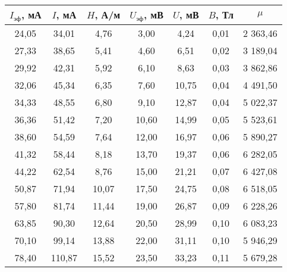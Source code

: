 \begin{table}[h!]
    \begin{center}
        \begin{tabular}{|c|c|c|c|c|c|c|}
            \hline
            $I_{\text{эф}}$, мА  & $I$, мА   & $H$, А/м  & $U_{\text{эф}}$, мВ  & $U$, мВ  & $B$, Тл & $\mu$      \\ \hline
            24,05                & 34,01     & 4,76      & 3,00                 & 4,24     & 0,01    & 2 363,46   \\ \hline
            27,33                & 38,65     & 5,41      & 4,60                 & 6,51     & 0,02    & 3 189,04   \\ \hline
            29,92                & 42,31     & 5,92      & 6,10                 & 8,63     & 0,03    & 3 862,86   \\ \hline
            32,06                & 45,34     & 6,35      & 7,60                 & 10,75    & 0,04    & 4 491,50   \\ \hline
            34,33                & 48,55     & 6,80      & 9,10                 & 12,87    & 0,04    & 5 022,37   \\ \hline
            36,36                & 51,42     & 7,20      & 10,60                & 14,99    & 0,05    & 5 523,61   \\ \hline
            38,60                & 54,59     & 7,64      & 12,00                & 16,97    & 0,06    & 5 890,27   \\ \hline
            41,32                & 58,44     & 8,18      & 13,70                & 19,37    & 0,06    & 6 282,05   \\ \hline
            44,22                & 62,54     & 8,76      & 15,00                & 21,21    & 0,07    & 6 427,08   \\ \hline
            50,87                & 71,94     & 10,07     & 17,50                & 24,75    & 0,08    & 6 518,05   \\ \hline
            57,80                & 81,74     & 11,44     & 19,00                & 26,87    & 0,09    & 6 228,26   \\ \hline
            63,85                & 90,30     & 12,64     & 20,50                & 28,99    & 0,10    & 6 083,23   \\ \hline
            70,10                & 99,14     & 13,88     & 22,00                & 31,11    & 0,10    & 5 946,29   \\ \hline
            78,40                & 110,87    & 15,52     & 23,50                & 33,23    & 0,11    & 5 679,28   \\ \hline

\end{tabular}
\end{center}
\end{table}
